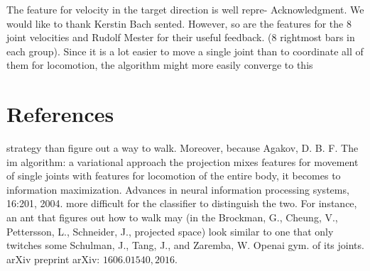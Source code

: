 The feature for velocity in the target direction is well repre- Acknowledgment. We would like to thank Kerstin Bach sented. However, so are the features for the 8 joint velocities and Rudolf Mester for their useful feedback. (8 rightmost bars in each group). Since it is a lot easier to move a single joint than to coordinate all of them for locomotion, the algorithm might more easily converge to this

\section{References} strategy than figure out a way to walk. Moreover, because Agakov, D. B. F. The im algorithm: a variational approach the projection mixes features for movement of single joints with features for locomotion of the entire body, it becomes to information maximization. Advances in neural information processing systems, 16:201, 2004. more difficult for the classifier to distinguish the two. For instance, an ant that figures out how to walk may (in the Brockman, G., Cheung, V., Pettersson, L., Schneider, J., projected space) look similar to one that only twitches some Schulman, J., Tang, J., and Zaremba, W. Openai gym. of its joints. arXiv preprint arXiv: $1606.01540,2016 .$

